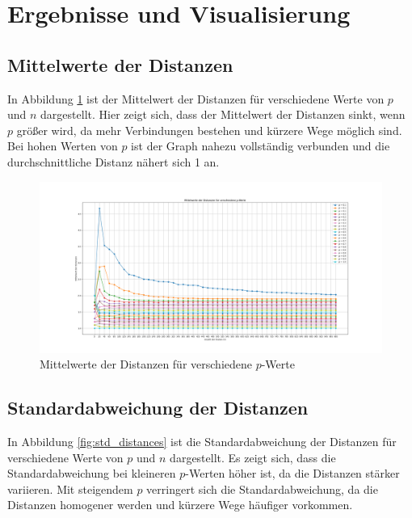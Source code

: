 \section{Ergebnisse und Visualisierung}

\subsection{Mittelwerte der Distanzen}
In Abbildung \ref{fig:mean_distances} ist der Mittelwert der Distanzen für verschiedene Werte von $p$ und $n$ dargestellt. Hier zeigt sich, dass der Mittelwert der Distanzen sinkt, wenn $p$ größer wird, da mehr Verbindungen bestehen und kürzere Wege möglich sind. Bei hohen Werten von $p$ ist der Graph nahezu vollständig verbunden und die durchschnittliche Distanz nähert sich 1 an.

\begin{figure}
    \centering
    \includegraphics[width=\textwidth]{MittelwerteDistanzen}
    \caption{Mittelwerte der Distanzen für verschiedene $p$-Werte}
    \label{fig:mean_distances}
\end{figure}

\subsection{Standardabweichung der Distanzen}
In Abbildung \ref{fig:std_distances} ist die Standardabweichung der Distanzen für verschiedene Werte von $p$ und $n$ dargestellt. Es zeigt sich, dass die Standardabweichung bei kleineren $p$-Werten höher ist, da die Distanzen stärker variieren. Mit steigendem $p$ verringert sich die Standardabweichung, da die Distanzen homogener werden und kürzere Wege häufiger vorkommen.

